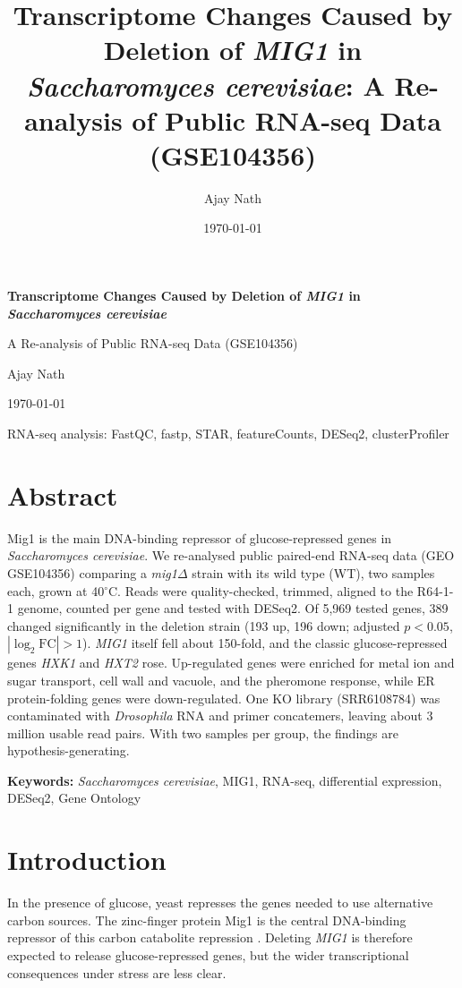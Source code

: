 \documentclass[11pt, a4paper]{article}
\title{Transcriptome Changes Caused by Deletion of \textit{MIG1} in \textit{Saccharomyces cerevisiae}: A Re-analysis of Public RNA-seq Data (GSE104356)}
\author{Ajay Nath}
\date{\today}
\begin{document}
\begin{titlepage}
\centering
\vspace*{3cm}
{\LARGE\bfseries Transcriptome Changes Caused by Deletion of \textit{MIG1} in \textit{Saccharomyces cerevisiae}\par}
\vspace{0.8cm}
{\Large A Re-analysis of Public RNA-seq Data (GSE104356)\par}
\vspace{3cm}
{\large Ajay Nath\par}
\vspace{0.5cm}
{\large \today\par}
\vfill
{\normalsize RNA-seq analysis: FastQC, fastp, STAR, featureCounts, DESeq2, clusterProfiler\par}
\end{titlepage}

\tableofcontents
\clearpage

\section*{Abstract}
Mig1 is the main DNA-binding repressor of glucose-repressed genes in \textit{Saccharomyces cerevisiae}. We re-analysed public paired-end RNA-seq data (GEO GSE104356) comparing a \textit{mig1}$\Delta$ strain with its wild type (WT), two samples each, grown at 40$^\circ$C. Reads were quality-checked, trimmed, aligned to the R64-1-1 genome, counted per gene and tested with DESeq2. Of 5,969 tested genes, 389 changed significantly in the deletion strain (193 up, 196 down; adjusted $p<0.05$, $|\log_2\mathrm{FC}|>1$). \textit{MIG1} itself fell about 150-fold, and the classic glucose-repressed genes \textit{HXK1} and \textit{HXT2} rose. Up-regulated genes were enriched for metal ion and sugar transport, cell wall and vacuole, and the pheromone response, while ER protein-folding genes were down-regulated. One KO library (SRR6108784) was contaminated with \textit{Drosophila} RNA and primer concatemers, leaving about 3 million usable read pairs. With two samples per group, the findings are hypothesis-generating.

\noindent\textbf{Keywords:} \textit{Saccharomyces cerevisiae}, MIG1, RNA-seq, differential expression, DESeq2, Gene Ontology

\section{Introduction}
In the presence of glucose, yeast represses the genes needed to use alternative carbon sources. The zinc-finger protein Mig1 is the central DNA-binding repressor of this carbon catabolite repression \cite{nehlin1990,gancedo1998}. Deleting \textit{MIG1} is therefore expected to release glucose-repressed genes, but the wider transcriptional consequences under stress are less clear.
\end{document}
